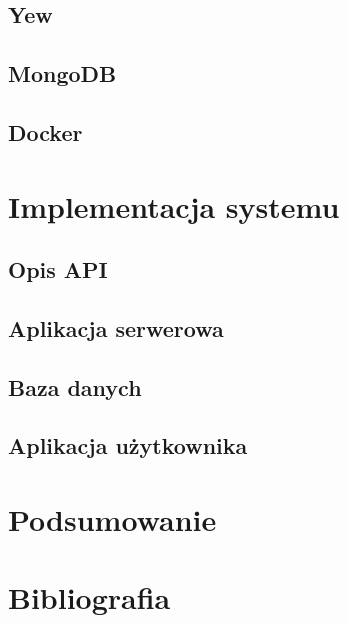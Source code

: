 \documentclass[12pt,a4paper]{article}
\begin{document}
\subsection{Yew}


\subsection{MongoDB}


\subsection{Docker}

\section{Implementacja systemu}
\subsection{Opis API}
\subsection{Aplikacja serwerowa}
\subsection{Baza danych}
\subsection{Aplikacja użytkownika}

\section{Podsumowanie}

\section{Bibliografia}
\end{document}
